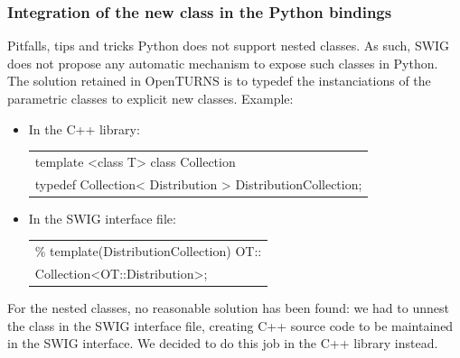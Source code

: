 \documentclass[8pt]{beamer}
\begin{document}
\begin{frame}
  \frametitle{Integration of the new class in the Python bindings}
  \begin{block}{Pitfalls, tips and tricks}
    Python does not support nested classes. As such, SWIG does  not propose any automatic mechanism to expose such classes in Python. The solution retained in OpenTURNS is to typedef the instanciations of the parametric classes to explicit new classes. Example:
    \begin{itemize}
    \item In the C++ library:
      \small
      \begin{tabular}{l}
        \ttfamily template <class T> class Collection \\
        \ttfamily typedef Collection< Distribution > DistributionCollection;
      \end{tabular}
      \normalsize
    \item In the SWIG interface file:
      \small
      \begin{tabular}{l}
        \ttfamily \% template(DistributionCollection) OT::\\
        \ttfamily Collection<OT::Distribution>;
      \end{tabular}
      \normalsize
    \end{itemize}
    For the nested classes, no reasonable solution has been found: we had to unnest the class in the SWIG interface file, creating C++ source code to be maintained in the SWIG interface. We decided to do this job in the C++ library instead.
  \end{block}
\end{frame}
\end{document}
